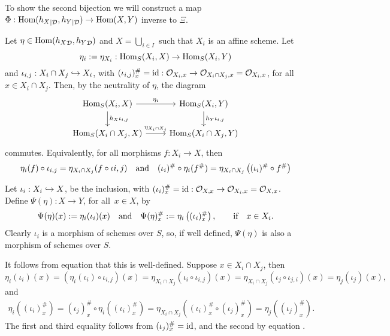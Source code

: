 \documentclass[a5paper,11pt,english]{article}
\renewcommand{\O}{\mathcal{O}}
\newcommand{\Dd}{\mathcal{D}}
\begin{document}
\begin{exercise}[2]
\begin{enumerate}
To show the second bijection we will construct a map $\Phi: \Hom({h_X}_{|\Dd},
{h_Y}_{|\Dd}) \to \Hom(X,Y)$ inverse to $\Xi$.

Let $\eta \in \Hom({h_X}_{\Dd}, {h_Y}_{\Dd})$ and $X = \bigcup_{i\in I}$ such that
$X_i$ is an affine scheme. Let 
\[ \eta_i := \eta_{X_i} : \operatorname{Hom}_S(X_i, X) \to \operatorname{Hom}_S(X_i, Y) \]
and $\iota_{i,j} : X_i \cap X_j \hookrightarrow X_i$, with $(\iota_{i,j})^\#_x = \id :
\O_{X_i,x} \to \O_{X_i\cap X_j, x} = \O_{X_i,x}$, for all $x\in X_i \cap X_j$. Then, by the neutrality of $\eta$, 
the diagram 
\[ \begin{tikzcd}
\Hom_S(X_i, X) \arrow[r, "\eta_i"] \arrow[d,"h_X \iota_{i,j}"] &
\Hom_S(X_i, Y) \arrow[d, "h_Y\iota_{i,j}"] \\
\Hom_S(X_i\cap X_j, X) \arrow[r, "\eta_{X_i\cap X_j}"] &
\Hom_S(X_i\cap X_j, Y) 
\end{tikzcd} \]
commutes. Equivalently, for all morphisms $f : X_i \to X$, then 
\begin{equation}
\eta_i(f) \circ \iota_{i,j} = \eta_{X_i \cap X_j} (f \circ \iota{i,j})
\quad\text{and}\quad
(\iota_i)^\# \circ \eta_i(f^\#) = \eta_{X_i \cap X_j} \left( (\iota_i)^\# \circ
f^\#  \right)
\label{eq:2.2}
\end{equation}

Let $\iota_i : X_i \hookrightarrow X$, be the inclusion, with $(\iota_i)^\#_x = \id : \O_{X,x}
\to \O_{X_i,x} = \O_{X,x}$. 
Define $\Psi(\eta): X \to Y$, for all $x \in X$, by
\[ \Psi(\eta)(x) := \eta_i(\iota_i)(x) \quad\text{and}\quad \Psi(\eta)_x^\# :=
\eta_i\left((\iota_i)_x^\#\right), \qquad\text{if} \quad x \in X_i. \]
Clearly $\iota_i$ is a morphism of schemes over $S$, so, if well defined,
$\Psi(\eta)$ is also a morphism of schemes over $S$.

It follows from equation  that this is well-defined. Suppose $x \in
X_i \cap X_j$, then
\[ \eta_i(\iota_i)(x) = (\eta_i(\iota_i) \circ \iota_{i,j})(x) 
= \eta_{X_i\cap X_j} (\iota_i \circ \iota_{i,j})(x) 
= \eta_{X_i\cap X_j} (\iota_j \circ \iota_{j,i})(x)
= \eta_j(\iota_j)(x), \]
and 
\begin{align*}
\eta_i\left((\iota_i)_x^\#\right)
= (\iota_j)_x^\# \circ \eta_i\left( (\iota_i)_x^\#   \right)
= \eta_{X_i \cap X_j} \left( (\iota_i)_x^\# \circ (\iota_j)_x^\#  \right)
= \eta_j\left((\iota_j)_x^\#\right).
\end{align*}
The first and third equality follows from $(\iota_j)_x^\# = \operatorname{id}$, and the second
by equation . 


\end{enumerate}
\end{exercise}
\end{document}
